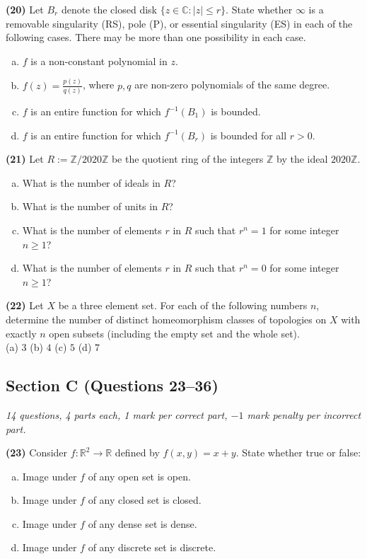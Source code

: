 \documentclass[11pt,a4paper]{article}
\newcommand{\Z}{\mathbb{Z}}
\newcommand{\R}{\mathbb{R}}
\newcommand{\C}{\mathbb{C}}
\newcommand{\examsec}[1]{%
  \subsection*{#1}
  \vspace{-2pt}
}
\newcommand{\qitem}[1]{\par\medskip\noindent\textbf{#1}\hspace{0.5em}}
\begin{document}
\qitem{(20)} Let $B_r$ denote the closed disk $\{z \in \C : |z| \le r\}$. State whether $\infty$ is a removable singularity (RS), pole (P), or essential singularity (ES) in each of the following cases. There may be more than one possibility in each case.
\begin{enumerate}[(a)]
  \item $f$ is a non-constant polynomial in $z$.
  \item $f(z) = \frac{p(z)}{q(z)}$, where $p, q$ are non-zero polynomials of the same degree.
  \item $f$ is an entire function for which $f^{-1}(B_1)$ is bounded.
  \item $f$ is an entire function for which $f^{-1}(B_r)$ is bounded for all $r > 0$.
\end{enumerate}

\qitem{(21)} Let $R := \Z/2020\Z$ be the quotient ring of the integers $\Z$ by the ideal $2020\Z$.
\begin{enumerate}[(a)]
  \item What is the number of ideals in $R$?
  \item What is the number of units in $R$?
  \item What is the number of elements $r$ in $R$ such that $r^n = 1$ for some integer $n \ge 1$?
  \item What is the number of elements $r$ in $R$ such that $r^n = 0$ for some integer $n \ge 1$?
\end{enumerate}

\qitem{(22)} Let $X$ be a three element set. For each of the following numbers $n$, determine the number of distinct homeomorphism classes of topologies on $X$ with exactly $n$ open subsets (including the empty set and the whole set).\\
(a) $3$ \qquad (b) $4$ \qquad (c) $5$ \qquad (d) $7$

\examsec{Section C (Questions 23--36)}
\noindent\emph{14 questions, 4 parts each, 1 mark per correct part, $-1$ mark penalty per incorrect part.}

\qitem{(23)} Consider $f : \R^2 \to \R$ defined by $f(x, y) = x + y$. State whether true or false:
\begin{enumerate}[(a)]
  \item Image under $f$ of any open set is open.
  \item Image under $f$ of any closed set is closed.
  \item Image under $f$ of any dense set is dense.
  \item Image under $f$ of any discrete set is discrete.
\end{enumerate}
\end{document}
